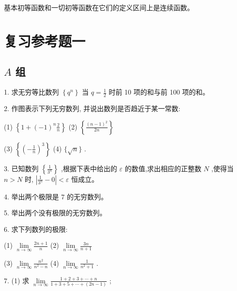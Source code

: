 \documentclass[lang=cn,newtx,12pt,scheme=chinese]{elegantbook}
\begin{document}
基本初等函数和一切初等函数在它们的定义区间上是连续函数。

\chapter*{复习参考题一}
\section*{\(A\) 组}

1. 求无穷等比数列 \(\left\{ {q}^{n}\right\}\) 当 \(q = \frac{1}{2}\) 时前 10 项的和与前 100 项的和。

2. 作图表示下列无穷数列, 并说出数列是否趋近于某一常数:

(1) \(\left\{ {1 + {\left( -1\right) }^{n}\frac{2}{n}}\right\}\) (2) \(\left\{ \frac{{\left( n - 1\right) }^{2}}{2n}\right\}\)

(3) \(\left\{ {\left( -\frac{1}{n}\right) }^{3}\right\}\) (4) \(\{ \sqrt{n}\}\) .

3. 已知数列 \(\left\{ \frac{1}{{3}^{n}}\right\}\) ,根据下表中给出的 \(\varepsilon\) 的数值,求出相应的正整数 \(N\) ,使得当 \(n > N\) 时, \(\left| {\frac{1}{{3}^{n}} - 0}\right| < \varepsilon\) 恒成立。

\begin{center}
\end{center}

4. 举出两个极限是 7 的无穷数列。

5. 举出两个没有极限的无穷数列。

6. 求下列数列的极限:

(1) \(\mathop{\lim }\limits_{{n \rightarrow \infty }}\frac{{2n} + 1}{n}\) (2) \(\mathop{\lim }\limits_{{n \rightarrow \infty }}\frac{3n}{n + 1}\)

(3) \(\mathop{\lim }\limits_{{n \rightarrow \infty }}\frac{{n}^{2}}{{n}^{2} - n}\) (4) \(\mathop{\lim }\limits_{{n \rightarrow \infty }}\frac{1}{{n}^{2} + 1}\) .

7. (1) 求 \(\mathop{\lim }\limits_{{n \rightarrow \infty }}\frac{1 + 2 + 3 + \cdots + n}{1 + 3 + 5 + \cdots + \left( {{2n} - 1}\right) }\) ;
\end{document}
